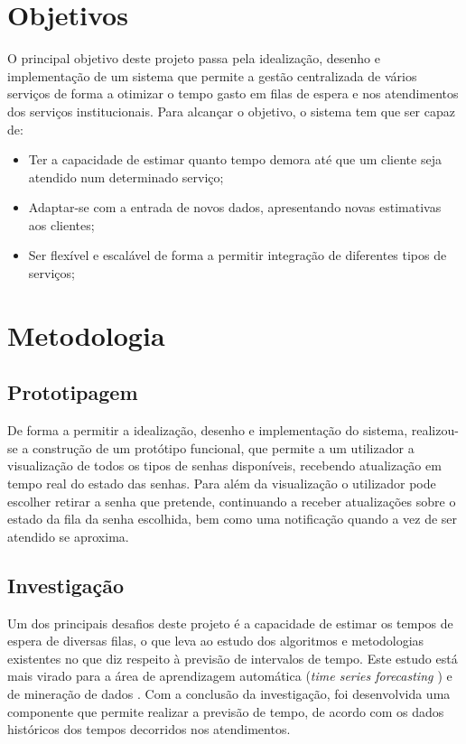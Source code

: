 \section{Objetivos} 
\label{sec:introduction}
O principal objetivo deste projeto passa pela idealização, desenho e implementação de um sistema que permite a gestão centralizada de vários serviços de forma a otimizar o tempo gasto em filas de espera e nos atendimentos dos serviços institucionais. 
Para alcançar o objetivo, o sistema tem que ser capaz de:
\begin{itemize}
\item Ter a capacidade de estimar quanto tempo demora até que um cliente seja atendido num determinado serviço;
\item Adaptar-se com a entrada de novos dados, apresentando novas estimativas aos clientes;
\item Ser flexível e escalável de forma a permitir integração de diferentes tipos de serviços;
\end{itemize}


\section{Metodologia} 
\label{sec:introduction}

\subsection{Prototipagem}
\label{sec:introduction}
De forma a permitir a idealização, desenho e implementação do sistema, realizou-se a construção de um protótipo funcional, que permite a um utilizador a visualização de todos os tipos de senhas disponíveis, recebendo atualização em tempo real do estado das senhas. Para além da visualização o utilizador pode escolher retirar a senha que pretende, continuando a receber atualizações sobre o estado da fila da senha escolhida, bem como uma notificação quando a vez de ser atendido se aproxima. 

\subsection{Investigação}
\label{sec:introduction}
Um dos principais desafios deste projeto é a capacidade de estimar os tempos de espera de diversas filas, o que leva ao estudo dos algoritmos e metodologias existentes no que diz respeito à previsão de intervalos de tempo. Este estudo está mais virado para a área de aprendizagem automática (\textit{time series forecasting \cite{timeseries}}) e de mineração de dados \cite{tempdatamining}. Com a conclusão da investigação, foi desenvolvida uma componente que permite realizar a previsão de tempo, de acordo com os dados históricos dos tempos decorridos nos atendimentos.

